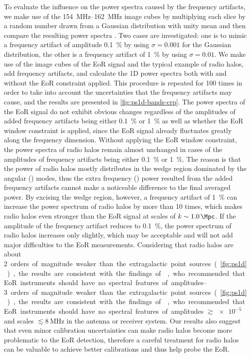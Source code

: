 \documentclass[modern]{aastex62}
\newcommand{\klos}{\text{$k_{\parallel}$}}
\newcommand{\kperp}{\text{$k_{\bot}$}}
\begin{document}
To evaluate the influence on the power spectra caused by the frequency
artifacts, we make use of the \SIrange{154}{162}{\MHz} image cubes by
multiplying each slice by a random number drawn from a Gaussian
distribution with unity mean and then compare the resulting power
spectra \citep{chapman2016}.
Two cases are investigated: one is to mimic a frequency artifact of
amplitude \SI{0.1}{\percent} by using $\sigma = 0.001$ for the Gaussian
distribution, the other is a frequency artifact of \SI{1}{\percent}
by using $\sigma = 0.01$.
We make use of the image cubes of the EoR signal and the typical example
of radio halos, add frequency artifacts, and calculate the 1D power
spectra both with and without the EoR constraint applied.
This procedure is repeated for 100 times in order to take into account
the uncertainties that the frequency artifacts may cause, and the results
are presented in \autoref{fig:ps1d-bands-crp}.
The power spectra of the EoR signal do not exhibit obvious changes
regardless of the amplitudes of added frequency artifacts being either
\SI{0.1}{\percent} or \SI{1}{\percent} as well as whether the EoR window
constraint is applied, since the EoR signal already fluctuates greatly
along the frequency dimension.
Without applying the EoR window constraint, the power spectra of radio
halos remain almost unchanged in cases of the amplitudes of frequency
artifacts being either \SI{0.1}{\percent} or \SI{1}{\percent}.
The reason is that the power of radio halos mostly distributes in the
wedge region dominated by the angular (\kperp) modes, thus the extra
frequency (\klos) power resulted from the added frequency artifacts
cannot make a noticeable difference to the final averaged power.
By excising the wedge region, however, a frequency artifact of
\SI{1}{\percent} can increase the power spectrum of radio halos by
more than 10 times, which makes radio halos even stronger than the
EoR signal at scales of $k \sim \SI{1.0}{\per\Mpc}$.
If the amplitude of the frequency artifact reduces to \SI{0.1}{\percent},
the power spectrum of radio halos increases only slightly, which may be
acceptable and will not add major difficulties to the EoR measurements.
Considering that radio halos are about \SIrange{2}{3} orders of magnitude
weaker than the extragalactic point sources (\autoref{fig:ps1d}),
the results are consistent with the findings of \citet{barry2016},
who recommended that EoR instruments should have no spectral features
of amplitudes $\gtrsim \num{e-5}$ and scales $\lesssim \SI{8}{\MHz}$
in the antenna or receiver system.
Our results also suggest that even minor calibration uncertainties can
make radio halos become more problematic to the EoR detection, therefore
a careful treatment for radio halos can be valuable to achieve better
calibrations and thus help probe the EoR.
\end{document}
